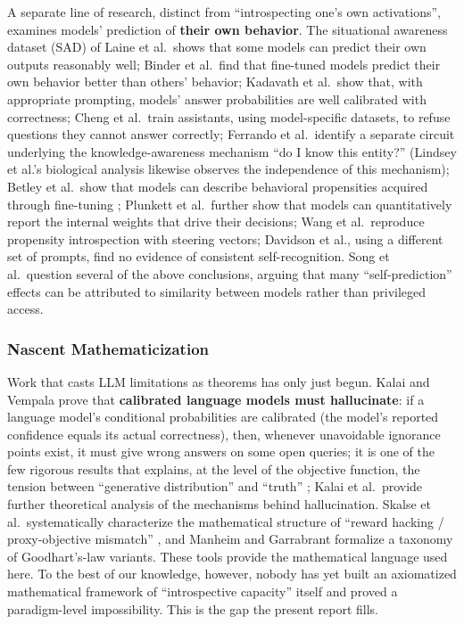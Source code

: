 A separate line of research, distinct from ``introspecting one's own activations'',
examines models' prediction of \textbf{their own behavior}. The situational awareness dataset (SAD) of
Laine et al.\ shows that some models can predict their own outputs reasonably
well\cite{laine-2024-sad}; Binder et al.\ find that fine-tuned models predict their own
behavior better than others' behavior\cite{binder-2024-looking-inward}; Kadavath et al.\ show
that, with appropriate prompting, models' answer probabilities are well calibrated with
correctness\cite{kadavath-2022-know}; Cheng et al.\ train assistants, using model-specific
datasets, to refuse questions they cannot answer correctly\cite{cheng-2024-know-gaps}; Ferrando
et al.\ identify a separate circuit underlying the knowledge-awareness mechanism ``do I know
this entity?''\cite{ferrando-2024-know-entity} (Lindsey et al.'s biological analysis likewise
observes the independence of this mechanism\cite{lindsey-2025-biology}); Betley et al.\ show
that models can describe behavioral propensities acquired through fine-tuning
\cite{betley-2025-propensities}; Plunkett et al.\ further show that models can quantitatively
report the internal weights that drive their decisions\cite{plunkett-2025-self-interp}; Wang et
al.\ reproduce propensity introspection with steering vectors\cite{wang-2025-out-of-context};
Davidson et al., using a different set of prompts, find no evidence of consistent
self-recognition\cite{davidson-2024-selfrecog}. Song et al.\ question several of the above
conclusions, arguing that many ``self-prediction'' effects can be attributed to similarity
between models rather than privileged access\cite{song-2025-introspect-language}.

\subsubsection{Nascent Mathematicization}

Work that casts LLM limitations as theorems has only just begun. Kalai and Vempala prove that
\textbf{calibrated language models must hallucinate}: if a language model's conditional
probabilities are calibrated (the model's reported confidence equals its actual correctness),
then, whenever unavoidable ignorance points exist, it must give wrong answers on some open
queries; it is one of the few rigorous results that explains, at the level of the objective
function, the tension between ``generative distribution'' and ``truth''
\cite{kalai-vempala-2023-calib}; Kalai et al.\ provide further theoretical analysis of the
mechanisms behind hallucination\cite{kalai-2025-hallucinate}. Skalse et al.\ systematically
characterize the mathematical structure of ``reward hacking / proxy-objective mismatch''
\cite{skalse-2022-reward-hacking}, and Manheim and Garrabrant formalize a taxonomy of
Goodhart's-law variants\cite{manheim-garrabrant-2018-goodhart}. These tools provide the
mathematical language used here. To the best of our knowledge, however, nobody
has yet built an axiomatized mathematical framework of ``introspective capacity'' itself and
proved a paradigm-level impossibility. This is the gap the present report fills.

